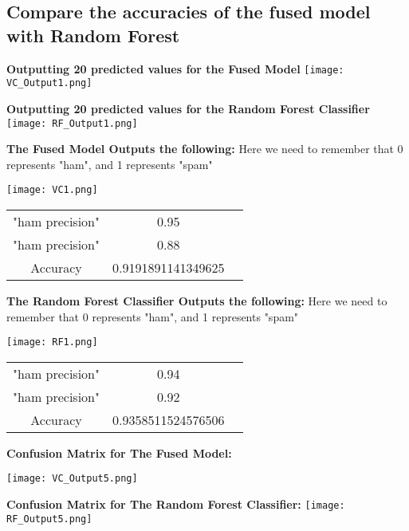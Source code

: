 \documentclass{article}
\begin{document}
\subsection{Compare the accuracies of the fused model with Random Forest}
\vspace{0.5cm}
\textbf{Outputting 20 predicted values for the Fused Model}
\vspace{0.5cm}
\texttt{[image: VC\_Output1.png]}

\textbf{Outputting 20 predicted values for the Random Forest Classifier}
\vspace{2cm}
\texttt{[image: RF\_Output1.png]}

\textbf{The Fused Model Outputs the following: }
Here we need to remember that 0 represents "ham", and 1 represents "spam"

\texttt{[image: VC1.png]}
\begin{center}
\begin{tabular}{ |c|c|c| } 
 \hline
 "ham precision" & 0.95  \\ 
 "ham precision" & 0.88 \\ 
 Accuracy  & 0.9191891141349625 \\ 
 \hline
\end{tabular}
\end{center}
\vspace{7cm}

\textbf{The Random Forest Classifier Outputs the following: }
Here we need to remember that 0 represents "ham", and 1 represents "spam"

\texttt{[image: RF1.png]}
\begin{center}
\begin{tabular}{ |c|c|c| } 
 \hline
 "ham precision" & 0.94  \\ 
 "ham precision" & 0.92 \\ 
 Accuracy  & 0.9358511524576506 \\ 
 \hline
\end{tabular}
\end{center}
\vspace{16cm}
\centering
\textbf{Confusion Matrix for The Fused Model: }

\texttt{[image: VC\_Output5.png]}
\vspace{0.5cm}

\textbf{Confusion Matrix for The Random Forest Classifier: }
\texttt{[image: RF\_Output5.png]}
\end{document}
